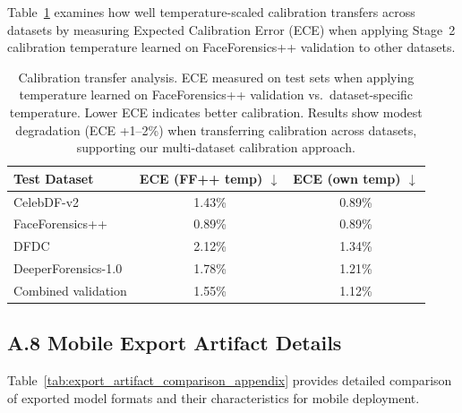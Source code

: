 Table~\ref{tab:calibration_transfer_appendix} examines how well temperature-scaled calibration transfers across datasets by measuring Expected Calibration Error (ECE) when applying Stage~2 calibration temperature learned on FaceForensics++ validation to other datasets.

\begin{table}[h]
  \centering
  \caption{Calibration transfer analysis. ECE measured on test sets when applying temperature learned on FaceForensics++ validation vs.\ dataset-specific temperature. Lower ECE indicates better calibration. Results show modest degradation (ECE +1--2\%) when transferring calibration across datasets, supporting our multi-dataset calibration approach.}
  \label{tab:calibration_transfer_appendix}
  {\small
  \begin{tabular}{@{}lcc@{}}
    \toprule
    Test Dataset & ECE (FF++ temp) $\downarrow$ & ECE (own temp) $\downarrow$ \\
    \midrule
    CelebDF-v2 & 1.43\% & 0.89\% \\
    FaceForensics++ & 0.89\% & 0.89\% \\
    DFDC & 2.12\% & 1.34\% \\
    DeeperForensics-1.0 & 1.78\% & 1.21\% \\
    \midrule
    Combined validation & 1.55\% & 1.12\% \\
    \bottomrule
  \end{tabular}}
\end{table}


\subsection*{A.8 Mobile Export Artifact Details}

Table~\ref{tab:export_artifact_comparison_appendix} provides detailed comparison of exported model formats and their characteristics for mobile deployment.

